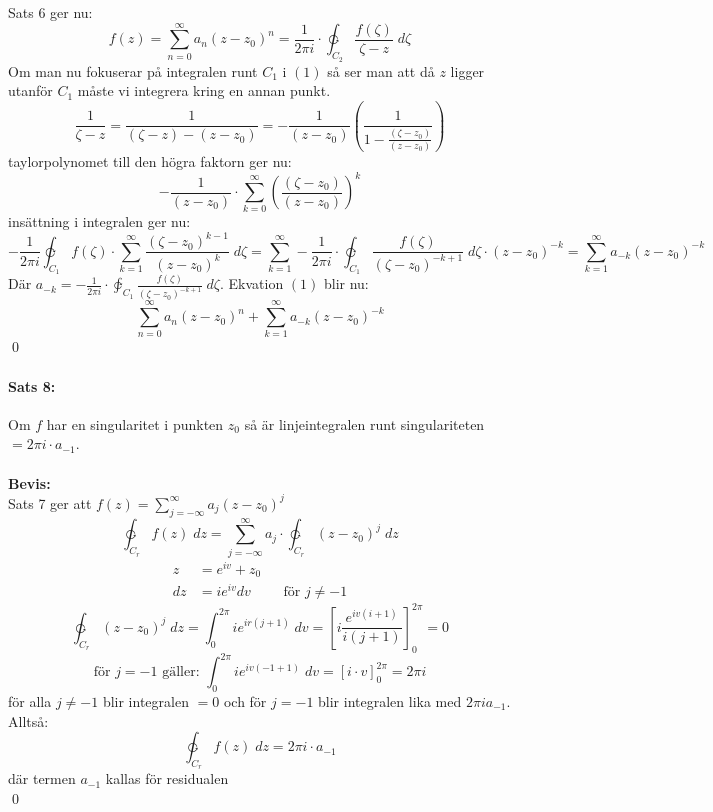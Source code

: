 Sats 6 ger nu:
\[
	f(z) = \sum_{n = 0}^\infty a_n (z - z_0)^n = \frac {1} {2 \pi i} \cdot \ointctrclockwise_{C_2} \frac 
		{f(\zeta)} {\zeta - z} \; d\zeta
\]
Om man nu fokuserar på integralen runt $C_1$ i $(1)$ så ser man att då $z$ ligger utanför $C_1$ 
måste vi integrera kring en annan punkt.
\[
	\frac {1} {\zeta - z} = \frac {1} {(\zeta - z) - (z - z_0)} = - \frac {1} {(z - z_0)}
		\left (
			\frac {1} {1 - \frac {(\zeta - z_0)} {(z - z_0)}}
		\right )
\]
taylorpolynomet till den högra faktorn ger nu:
\[
	- \frac {1} {(z - z_0)} \cdot \sum_{k = 0}^\infty
		\left (
			\frac {(\zeta - z_0)} {(z - z_0)}
		\right )^k
\]
insättning i integralen ger nu:
\[ %
	- \frac {1} {2 \pi i} \varointclockwise_{C_1} f(\zeta) \cdot \sum_{k = 1}^\infty \frac {(\zeta - z_0)^{k - 1}} {(z - z_0)^k} \; d\zeta
	= \sum_{k = 1}^\infty -\frac{1} {2 \pi i} \cdot \varointclockwise_{C_1} \frac {f(\zeta)} {(\zeta - z_0)^{-k + 1}} \; d\zeta \cdot
			(z - z_0)^{-k} = \sum_{k = 1}^\infty a_{-k} (z - z_0)^{-k}
\] %
Där $a_{-k} = -\frac{1} {2 \pi i} \cdot \varointclockwise_{C_1} \frac {f(\zeta)} {(\zeta - z_0)^{-k + 1}} \; d\zeta$.
Ekvation $(1)$ blir nu:
\[
	\sum_{n = 0}^\infty a_n(z - z_0)^n + \sum_{k = 1}^\infty a_{-k}(z - z_0)^{-k}
\]
\hfill \qed

\paragraph{Sats 8:}
Om $f$ har en singularitet i punkten $z_0$ så är linjeintegralen runt singulariteten $= 2 \pi i \cdot a_{-1}$.\\
\\
{\bf Bevis:}\\
Sats 7 ger att $f(z) = \sum\limits_{j = - \infty}^\infty a_j (z - z_0)^j$
\[
	\ointctrclockwise_{C_r} f(z) \; dz = \sum_{j = - \infty}^\infty a_j \cdot \ointctrclockwise_{C_r} (z - z_0)^j \; dz
\]
\begin{align*}
	z &= e^{iv} + z_0 \\
	dz &= ie^{iv} dv \qquad \text{ för } j \neq - 1
\end{align*}
\[
	\ointctrclockwise_{C_r} (z - z_0)^j \; dz = \int_0^{2 \pi} ie^{ir(j + 1)} \; dv =
	\left [
		i \frac {e^{iv(i + 1)}} {i (j + 1)}
	\right ]_0^{2 \pi}
	= 0
\]
\[
	\text{för } j = -1 \text{ gäller: } \int_0^{2\pi} ie^{iv(-1 + 1)} \; dv = 
	\left [
		i \cdot v
	\right ]_0^{2\pi}
	= 2 \pi i
\]
för alla $j \neq -1$ blir integralen $ = 0$ och för $j = -1$ blir integralen lika med $2 \pi i a_{- 1}$.
Alltså:
\[
	\ointctrclockwise_{C_r} f(z) \; dz = 2 \pi i \cdot a_{-1}
\]
där termen $a_{-1}$ kallas för residualen \\
\hfill \qed


